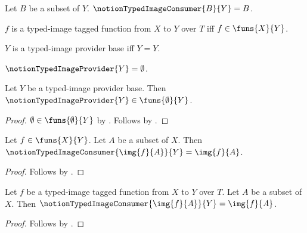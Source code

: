 

\begin{definition}\label{notion_typed_image_consumer}
    Let $B$ be a subset of $Y$.
    $\notionTypedImageConsumer{B}{Y}=B$.
\end{definition}

\begin{abbreviation}\label{notion_typed_image_tagged_function}
    $f$ is a typed-image tagged function from $X$ to $Y$ over $T$ iff
        $f\in\funs{X}{Y}$.
\end{abbreviation}

\begin{definition}\label{notion_typed_image_provider_base}
    $Y$ is a typed-image provider base iff $Y=Y$.
\end{definition}

\begin{definition}\label{notion_typed_image_provider}
    $\notionTypedImageProvider{Y}=\emptyset$.
\end{definition}

\begin{classification}\label{notion_typed_image_provider_result}
    Let $Y$ be a typed-image provider base.
    Then $\notionTypedImageProvider{Y}\in\funs{\emptyset}{Y}$.
\end{classification}
\begin{proof}
    $\emptyset\in\funs{\emptyset}{Y}$ by
        .
    Follows by .
\end{proof}

\begin{proposition}\label{notion_typed_image_direct}
    Let $f\in\funs{X}{Y}$.
    Let $A$ be a subset of $X$.
    Then $\notionTypedImageConsumer{\img{f}{A}}{Y}=\img{f}{A}$.
\end{proposition}
\begin{proof}
    Follows by .
\end{proof}

\begin{proposition}\label{notion_typed_image_row_safe_unary}
    Let $f$ be a typed-image tagged function from $X$ to $Y$ over $T$.
    Let $A$ be a subset of $X$.
    Then $\notionTypedImageConsumer{\img{f}{A}}{Y}=\img{f}{A}$.
\end{proposition}
\begin{proof}
    Follows by .
\end{proof}

